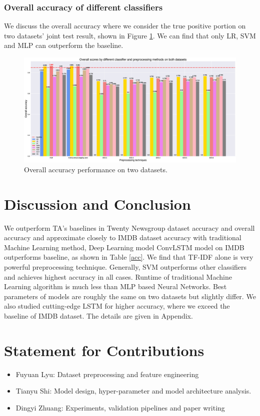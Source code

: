 \documentclass[11pt]{scrartcl}
\begin{document}
\subsubsection*{Overall accuracy of different classifiers}
We discuss the overall accuracy where we consider the true positive portion on two datasets' joint test result, shown in Figure \ref{overall_accuracy}. We can find that only LR, SVM and MLP can outperform the baseline.

\begin{figure}[H]
	\centering
	\includegraphics[width=0.9 \linewidth]{fig/model_acc_overall.eps}
	\caption{Overall accuracy performance on two datasets.}
	\label{overall_accuracy}
\end{figure}



\section{Discussion and Conclusion}
We outperform TA's baselines in Twenty Newsgroup dataset accuracy and overall accuracy and approximate closely to IMDB dataset accuracy with traditional Machine Learning method, Deep Learning model ConvLSTM model on IMDB outperforms baseline, as shown in Table \ref{acc}. We find that TF-IDF alone is very powerful preprocessing technique. Generally, SVM outperforms other classifiers and achieves highest accuracy in all cases. Runtime of traditional Machine Learning algorithm is much less than MLP based Neural Networks. Best parameters of models are roughly the same on two datasets but slightly differ. We also studied cutting-edge LSTM for higher accuracy, where we exceed the baseline of IMDB dataset. The details are given in Appendix.

\section{Statement for Contributions}
\begin{itemize}
	\item Fuyuan Lyu: Dataset preprocessing and feature engineering
	\item Tianyu Shi: Model design, hyper-parameter and model architecture analysis.
	\item Dingyi Zhuang: Experiments, validation pipelines and paper writing
\end{itemize}
\newpage
\end{document}
